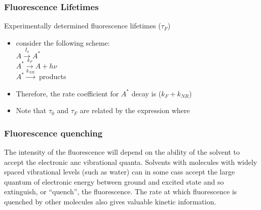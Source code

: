 \documentclass[a4paper,12pt,titlepage]{article}
\begin{document}
\begin{frame}[label=experimentallifetimes]
\frametitle{Fluorescence Lifetimes}
Experimentally determined fluorescence lifetimes (\(\tau_F\))\\
\begin{itemize}[<+->]
\item consider the following scheme:\\
\qquad \(A \xrightarrow{I_a} A^*\) \\
\qquad \(A^* \xrightarrow{k_F} A + h\nu\)\\
\qquad \(A^* \xrightarrow{k_{NR}} \) products
\item Therefore, the rate coefficient for \(A^*\) decay is (\(k_F + k_{NR}\))\\
\begin{center}  \end{center}
\item Note that \(\tau_0\) and \(\tau_F\) are related by the expression  \quad where 
\hyperlink{fluorescencelifetimes<8>}{}
\end{itemize}
\end{frame}

\begin{frame}
\frametitle{Fluorescence quenching}
\end{frame}

The intensity of the fluorescence will depend on the ability of the solvent to accept the electronic anc vibrational quanta. Solvents with molecules with widely spaced vibrational levels (such as water) can in some cass accept the large quantum of electronic energy between ground and excited state and so extinguish, or ``quench'', the fluorescence. The rate at which fluorescence is quenched by other molecules also gives valuable kinetic information.
\end{document}
